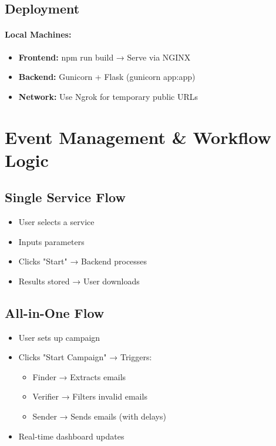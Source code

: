 \documentclass{article}
\begin{document}
\subsection{Deployment}
\paragraph{Local Machines:}
\begin{itemize}
    \item \textbf{Frontend:} npm run build → Serve via NGINX
    \item \textbf{Backend:} Gunicorn + Flask (gunicorn app:app)
    \item \textbf{Network:} Use Ngrok for temporary public URLs
\end{itemize}

\section{Event Management \& Workflow Logic}
\subsection{Single Service Flow}
\begin{itemize}
    \item User selects a service
    \item Inputs parameters
    \item Clicks "Start" → Backend processes
    \item Results stored → User downloads
\end{itemize}

\subsection{All-in-One Flow}
\begin{itemize}
    \item User sets up campaign
    \item Clicks "Start Campaign" → Triggers:
    \begin{itemize}
        \item Finder → Extracts emails
        \item Verifier → Filters invalid emails
        \item Sender → Sends emails (with delays)
    \end{itemize}
    \item Real-time dashboard updates
\end{itemize}
\end{document}
